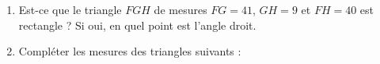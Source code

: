 
\begin{exercice}\label{exosmath-0963}

    \begin{enumerate}
        \item
            Est-ce que le triangle \( FGH\) de mesures \( FG=41\), \( GH=9\) et \( FH=40\) est rectangle ? Si oui, en quel point est l'angle droit.
        \item
            Compléter les mesures des triangles suivants :

            \begin{center}
                
   
   \hspace{2cm}
   
            \end{center}
    \end{enumerate}

\end{exercice}
